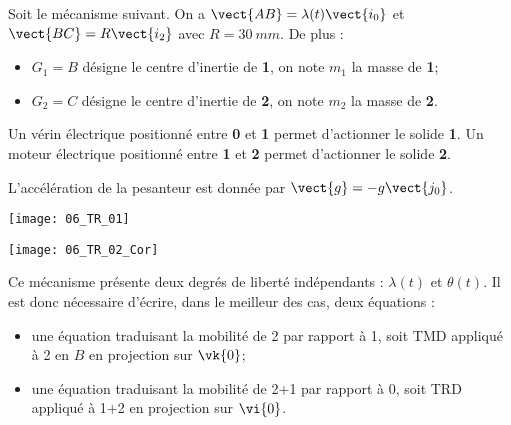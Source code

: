 \normaltrue
\correctiontrue


\setcounter{question}{0}
\ifcorrection
\else
{}
\fi

\ifprof
\else
Soit le mécanisme suivant. On a $\vect{AB}=\lambda(t)\vect{i_0}$ et $\vect{BC}=R\vect{i_2}$ avec $R=\SI{30}{mm}$.
De plus :
\begin{itemize}
\item $G_1=B$ désigne le centre d'inertie de \textbf{1}, on note $m_1$ la masse de \textbf{1};%
\item $G_2=C$ désigne le centre d'inertie de \textbf{2}, on note $m_2$ la masse de \textbf{2}.%
\end{itemize}

Un vérin électrique positionné entre \textbf{0} et \textbf{1}  permet d'actionner le solide \textbf{1}.
Un moteur électrique positionné entre \textbf{1} et \textbf{2}  permet d'actionner le solide \textbf{2}.

L'accélération de la pesanteur est donnée par $\vect{g}=-g\vect{j_0}$.

\begin{center}
\texttt{[image: 06\_TR\_01]}
\end{center}
\fi

\ifprof
\begin{center}
\texttt{[image: 06\_TR\_02\_Cor]}
\end{center}
\else
\fi

\ifprof
Ce mécanisme présente deux degrés de liberté indépendants : $\lambda(t)$ et $\theta(t)$. Il est donc nécessaire d'écrire, dans le meilleur des cas, deux équations :
\begin{itemize}
\item une équation traduisant la mobilité de 2 par rapport à 1, soit TMD appliqué à 2 en $B$ en projection sur $\vk{0}$;
\item une équation traduisant la mobilité de 2+1 par rapport à 0, soit TRD appliqué à 1+2 en projection sur $\vi{0}$.
\end{itemize}


